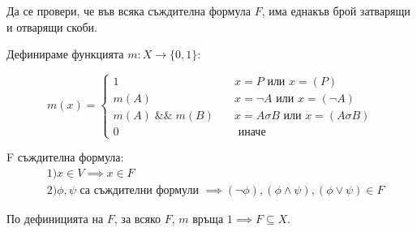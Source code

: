 \documentclass[a4paper]{article}
\begin{document}
Да се провери, че във всяка съждителна формула $F$, има еднакъв брой затварящи и отварящи скоби.

Дефинираме функцията $m : X \rightarrow \{0, 1\}$:

\[ m(x) =
\begin{cases}
  1    & \quad x = P \text{ или } x = (P)\\
  m(A) & \quad x = \neg A \text{ или } x = (\neg A)\\
  m(A)\;\&\&\;m(B) & \quad x = A \sigma B \text{ или } x = (A \sigma B)\\
  0 & \quad \text{ иначе }
\end{cases}
\]

F съждителна формула:
\begin{align*}
&  1) x \in V \implies x \in F\\
&  2) \phi, \psi \text{ са съждителни формули } \implies (\neg \phi), (\phi \land \psi), (\phi \lor \psi) \in F
\end{align*}

По дефиницията на $F$, за всяко $F$, $m \text{ връща } 1 \implies F \subseteq X$.
\end{document}
